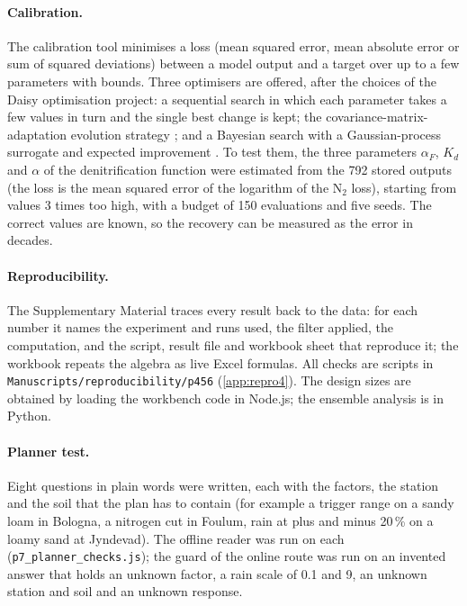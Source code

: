 \documentclass[preprint,12pt]{elsarticle}
\begin{document}
\paragraph{Calibration.}
The calibration tool minimises a loss (mean squared error, mean absolute error or sum of squared deviations) between a model output and a target over up to a few parameters with bounds. Three optimisers are offered, after the choices of the Daisy optimisation project: a sequential search in which each parameter takes a few values in turn and the single best change is kept; the covariance-matrix-adaptation evolution strategy \cite{HansenOstermeier2001}; and a Bayesian search with a Gaussian-process surrogate and expected improvement \cite{Mockus1978}. To test them, the three parameters $\alpha_F$, $K_d$ and $\alpha$ of the denitrification function were estimated from the 792 stored outputs (the loss is the mean squared error of the logarithm of the N$_2$ loss), starting from values 3 times too high, with a budget of 150 evaluations and five seeds. The correct values are known, so the recovery can be measured as the error in decades.

\paragraph{Reproducibility.}The Supplementary Material traces every result back to the data: for each number it names the experiment and runs used, the filter applied, the computation, and the script, result file and workbook sheet that reproduce it; the workbook repeats the algebra as live Excel formulas. 
All checks are scripts in \texttt{Manuscripts/reproducibility/p456} (\cref{app:repro4}). The design sizes are obtained by loading the workbench code in Node.js; the ensemble analysis is in Python.

\paragraph{Planner test.}
Eight questions in plain words were written, each with the factors, the station and the soil that the plan has to contain (for example a trigger range on a sandy loam in Bologna, a nitrogen cut in Foulum, rain at plus and minus 20\,\% on a loamy sand at Jyndevad). The offline reader was run on each (\texttt{p7\_planner\_checks.js}); the guard of the online route was run on an invented answer that holds an unknown factor, a rain scale of 0.1 and 9, an unknown station and soil and an unknown response.
\end{document}
